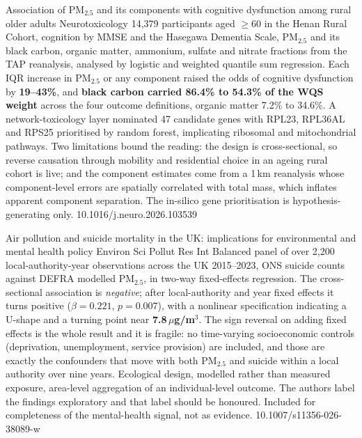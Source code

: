 \documentclass[10pt]{article}
\begin{document}

{Association of PM$_{2.5}$ and its components with cognitive dysfunction among rural
older adults}
{Neurotoxicology}
{14,379 participants aged $\geq$60 in the Henan Rural Cohort, cognition by MMSE and the
Hasegawa Dementia Scale, PM$_{2.5}$ and its black carbon, organic matter, ammonium,
sulfate and nitrate fractions from the TAP reanalysis, analysed by logistic and weighted
quantile sum regression. Each IQR increase in PM$_{2.5}$ or any component raised the odds
of cognitive dysfunction by \textbf{19--43\%}, and \textbf{black carbon carried 86.4\% to
54.3\% of the WQS weight} across the four outcome definitions, organic matter 7.2\% to
34.6\%. A network-toxicology layer nominated 47 candidate genes with RPL23, RPL36AL and
RPS25 prioritised by random forest, implicating ribosomal and mitochondrial pathways.
Two limitations bound the reading: the design is cross-sectional, so reverse causation
through mobility and residential choice in an ageing rural cohort is live; and the
component estimates come from a 1\,km reanalysis whose component-level errors are
spatially correlated with total mass, which inflates apparent component separation. The
in-silico gene prioritisation is hypothesis-generating only.}
{10.1016/j.neuro.2026.103539}

{Air pollution and suicide mortality in the UK: implications for environmental and mental
health policy}
{Environ Sci Pollut Res Int}
{Balanced panel of over 2,200 local-authority-year observations across the UK 2015--2023,
ONS suicide counts against DEFRA modelled PM$_{2.5}$, in two-way fixed-effects
regression. The cross-sectional association is \emph{negative}; after local-authority and
year fixed effects it turns positive ($\beta = 0.221$, $p = 0.007$), with a nonlinear
specification indicating a U-shape and a turning point near \textbf{7.8\,$\mu$g/m$^3$}.
The sign reversal on adding fixed effects is the whole result and it is fragile: no
time-varying socioeconomic controls (deprivation, unemployment, service provision) are
included, and those are exactly the confounders that move with both PM$_{2.5}$ and
suicide within a local authority over nine years. Ecological design, modelled rather than
measured exposure, area-level aggregation of an individual-level outcome. The authors
label the findings exploratory and that label should be honoured. Included for
completeness of the mental-health signal, not as evidence.}
{10.1007/s11356-026-38089-w}
\end{document}
